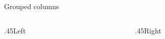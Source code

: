 \documentclass{beamer}
\date{}
\begin{document}
\begin{frame}[t]{Grouped columns}
\relax
{\small
\begin{columns}[onlytextwidth,T]
\begin{column}{.45\textwidth}Left\end{column}
\begin{column}{.45\textwidth}Right\end{column}
\end{columns}
\par}
\end{frame}
\end{document}
